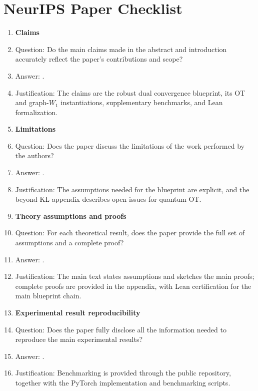 \documentclass{article}
\theoremstyle{plain}
\begin{document}


\section*{NeurIPS Paper Checklist}

\begin{enumerate}

\item {\bf Claims}
\item[] Question: Do the main claims made in the abstract and introduction accurately reflect the paper's contributions and scope?
\item[] Answer: \answerYes{}.
\item[] Justification: The claims are the robust dual convergence blueprint, its OT and graph-$W_1$ instantiations, supplementary benchmarks, and Lean formalization.

\item {\bf Limitations}
\item[] Question: Does the paper discuss the limitations of the work performed by the authors?
\item[] Answer: \answerYes{}.
\item[] Justification: The assumptions needed for the blueprint are explicit, and the beyond-KL appendix describes open issues for quantum OT.

\item {\bf Theory assumptions and proofs}
\item[] Question: For each theoretical result, does the paper provide the full set of assumptions and a complete proof?
\item[] Answer: \answerYes{}.
\item[] Justification: The main text states assumptions and sketches the main proofs; complete proofs are provided in the appendix, with Lean certification for the main blueprint chain.

\item {\bf Experimental result reproducibility}
\item[] Question: Does the paper fully disclose all the information needed to reproduce the main experimental results?
\item[] Answer: \answerYes{}.
\item[] Justification: Benchmarking is provided through the public repository, together with the PyTorch implementation and benchmarking scripts.


\end{enumerate}
\end{document}
